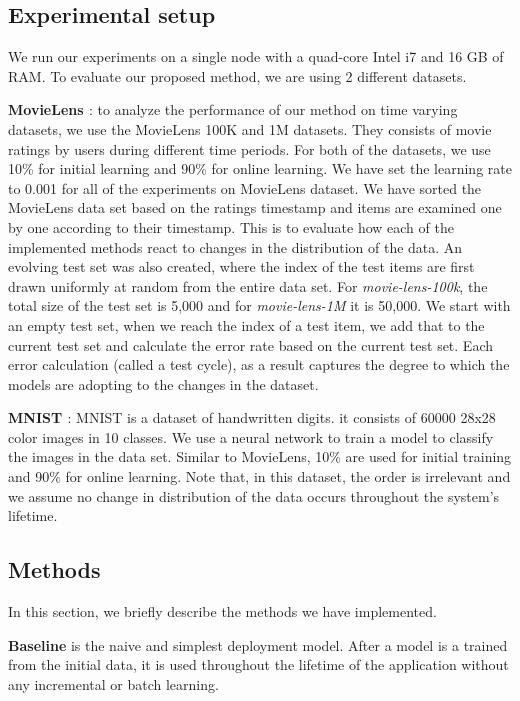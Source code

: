 \documentclass{vldb}
\begin{document}
\subsection{Experimental setup}
We run our experiments on a single node with a quad-core Intel i7 and 16 GB of RAM. 
To evaluate our proposed method, we are using 2 different datasets.

\textbf{MovieLens \cite{harper2016movielens}}: to analyze the performance of our method on time varying datasets, we use the MovieLens 100K and 1M datasets. 
They consists of movie ratings by users during different time periods. 
For both of the datasets, we use 10\% for initial learning and 90\% for online learning. 
We have set the learning rate to 0.001 for all of the experiments on MovieLens dataset.
We have sorted the MovieLens data set based on the ratings timestamp and items are examined one by one according to their timestamp.
This is to evaluate how each of the implemented methods react to changes in the distribution of the data.
An evolving test set was also created, where the index of the test items are first drawn uniformly at random from the entire data set.
For \textit{movie-lens-100k}, the total size of the test set is 5,000 and for \textit{movie-lens-1M} it is 50,000.
We start with an empty test set, when we reach the index of a test item, we add that to the current test set and calculate the error rate based on the current test set.
Each error calculation (called a test cycle), as a result captures the degree to which the models are adopting to the changes in the dataset.

\textbf{MNIST \cite{lecun-mnist}}: MNIST is a dataset of handwritten digits.
it consists of 60000 28x28 color images in 10 classes. We use a neural network to train a model to classify the images in the data set. 
Similar to MovieLens, 10\% are used for initial training and 90\% for online learning. 
Note that, in this dataset, the order is irrelevant and we assume no change in distribution of the data occurs throughout the system's lifetime. 

\subsection{Methods}
In this section, we briefly describe the methods we have implemented.

\textbf{Baseline} is the naive and simplest deployment model. 
After a model is a trained from the initial data, it is used throughout the lifetime of the application without any incremental or batch learning.
\end{document}
